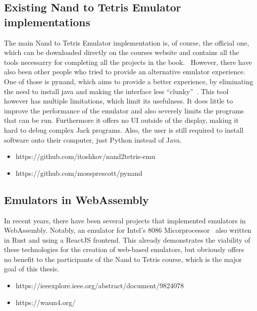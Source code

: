 \subsection{Existing Nand to Tetris Emulator implementations}

The main Nand to Tetris Emulator implementation is, of course, the official one, which can be downloaded directly on the courses website and contains all the tools necessarry for completing all the projects in the book.~\cite{n2tsoftware}
However, there have also been other people who tried to provide an alternative emulator experience. One of those is pynand, which aims to provide a better experience, by eliminating the need to install java and making the interface less ``clunky''~\cite{pynand}. This tool however has multiple limitations, which limit its usefulness. It does little to improve the performance of the emulator and also severely limits the programs that can be run. Furthermore it offers no UI outside of the display, making it hard to debug complex Jack programs. Also, the user is still required to install software onto their computer, just Python instead of Java.

\begin{itemize}
  \item https://github.com/itoshkov/nand2tetris-emu
  \item https://github.com/mossprescott/pynand
\end{itemize}

\subsection{Emulators in WebAssembly}

In recent years, there have been several projects that implemented emulators in WebAssembly. Notably, an emulator for Intel's 8086 Micorprocessor~\cite{9824078} also written in Rust and using a ReactJS frontend. This already demonstrates the viability of these technologies for the creation of web-based emulators, but obviously offers no benefit to the participants of the Nand to Tetris course, which is the major goal of this thesis.

\begin{itemize}
  \item https://ieeexplore.ieee.org/abstract/document/9824078
  \item https://wasm4.org/
\end{itemize}
